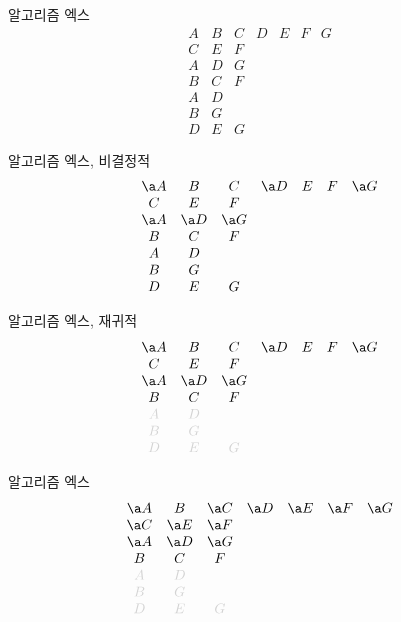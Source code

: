 \documentclass[xcolor=svgnames]{beamer}
\begin{document}
\renewcommand\arraystretch{1.2}

\begin{frame}{알고리즘 엑스}
\Large\boldmath
  $$
  \begin{array}{ccccccc}
    A & B & C & D & E & F & G\\
    C & E & F &&&&\\
    A & D & G &&&&\\
    B & C & F &&&&\\
    A & D &&&&&\\
    B & G &&&&&\\
    D & E & G &&&&
  \end{array}
  $$
\end{frame}

%
\begin{frame}{알고리즘 엑스, 비결정적}
\Large\boldmath
  $$
  \begin{array}{ccccccc}
    \a A & B & C & \a D & E & F & \a G\\
    C & E & F &&&&\\
    \a A & \a D & \a G &&&&\\
    B & C & F &&&&\\
    A & D &&&&&\\
    B & G &&&&&\\
    D & E & G &&&&
  \end{array}
  $$
\end{frame}

%
\begin{frame}{알고리즘 엑스, 재귀적}
\Large\boldmath
  $$
  \begin{array}{ccccccc}
    \a A & B & C & \a D & E & F & \a G\\
    C & E & F &&&&\\
    \a A & \a D & \a G &&&&\\
    B & C & F &&&&\\
    \g A & \g D &&&&&\\
    \g B & \g G &&&&&\\
    \g D & \g E & \g G &&&&
  \end{array}
  $$
\end{frame}

%
\begin{frame}{알고리즘 엑스}
\Large\boldmath
  $$
  \begin{array}{ccccccc}
    \a A & B & \a C & \a D & \a E & \a F & \a G\\
    \a C & \a E & \a F &&&&\\
    \a A & \a D & \a G &&&&\\
    B & C & F &&&&\\
    \g A & \g D &&&&&\\
    \g B & \g G &&&&&\\
    \g D & \g E & \g G &&&&
  \end{array}
  $$
\end{frame}
\end{document}
